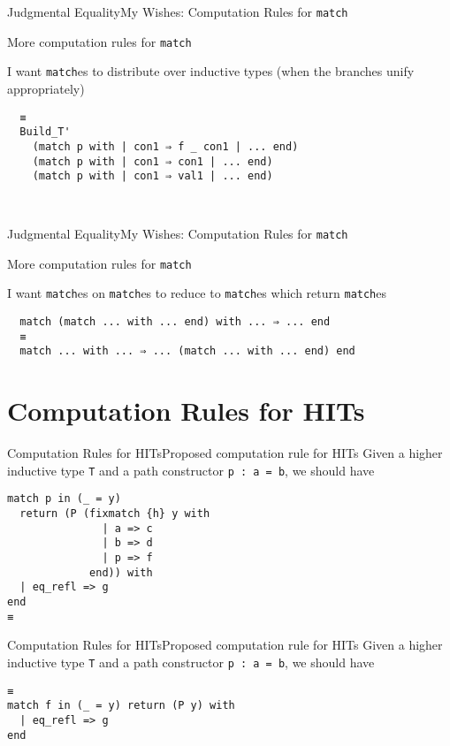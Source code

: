 \documentclass{beamer}
\begin{document}
\begin{frame}[fragile]{Judgmental Equality}{My Wishes: Computation Rules for \texorpdfstring{\texttt{match}}{match}}
  \Large
  \begin{center}
    More computation rules for \texttt{match}
  \end{center}
  I want \texttt{match}es to distribute over inductive types (when the branches unify appropriately)
\begin{verbatim}
  ≡
  Build_T'
    (match p with | con1 ⇒ f _ con1 | ... end)
    (match p with | con1 ⇒ con1 | ... end)
    (match p with | con1 ⇒ val1 | ... end)
    
    
\end{verbatim}
\end{frame}


\begin{frame}[fragile]{Judgmental Equality}{My Wishes: Computation Rules for \texorpdfstring{\texttt{match}}{match}}
  \Large
  \begin{center}
    More computation rules for \texttt{match}
  \end{center}
  I want \texttt{match}es on \texttt{match}es to reduce to \texttt{match}es which return \texttt{match}es
\begin{verbatim}
  match (match ... with ... end) with ... ⇒ ... end
  ≡
  match ... with ... ⇒ ... (match ... with ... end) end
\end{verbatim}
\end{frame}

\section{Computation Rules for HITs} \label{sec:comp-hit}

\begin{frame}[fragile]{Computation Rules for HITs}{Proposed computation rule for HITs}
\Large
Given a higher inductive type \verb|T| and a path constructor \verb|p : a = b|, we should have
\begin{verbatim}
match p in (_ = y)
  return (P (fixmatch {h} y with 
               | a => c
               | b => d
               | p => f
             end)) with
  | eq_refl => g
end
≡
\end{verbatim}
\end{frame}


\begin{frame}[fragile]{Computation Rules for HITs}{Proposed computation rule for HITs}
\Large
Given a higher inductive type \verb|T| and a path constructor \verb|p : a = b|, we should have
\begin{verbatim}
≡
match f in (_ = y) return (P y) with
  | eq_refl => g
end





\end{verbatim}
\end{frame}
\end{document}
